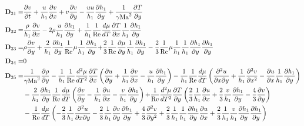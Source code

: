 \begin{align*}
  {\bf{D}}_{31}  =&\frac{{\partial v}}{{\partial t}} + \frac{u}{{h_1 }}\frac{{\partial v}}{{\partial x}} + v\frac{{\partial v}}{{\partial y}} - \frac{{uu}}{{h_1 }}\frac{{\partial h_1 }}{{\partial y}} + \frac{1}{{\gamma {\rm{Ma}}^2 }}\frac{{\partial T}}{{\partial y}}\\
  {\bf{D}}_{32}  =& \frac{\rho }{{h_1 }}\frac{{\partial v}}{{\partial x}} - 2\rho \frac{u}{{h_1 }}\frac{{\partial h_1 }}{{\partial y}} + \frac{1}{{h_1 }}\frac{1}{{{\mathop{\rm Re}\nolimits} }}\frac{{d\mu }}{{dT}}\frac{{\partial T}}{{\partial x}}\frac{1}{{h_1 }}\frac{{\partial h_1 }}{{\partial y}}\\
  {\bf{D}}_{33}  =& \rho \frac{{\partial v}}{{\partial y}} + \frac{2}{{h_1 }}\frac{{\partial h_1 }}{{\partial y}}\frac{1}{{{\mathop{\rm Re}\nolimits} }}\mu \frac{1}{{h_1 }}\frac{{\partial h_1 }}{{\partial y}}{\rm{ + }}\frac{2}{3}\frac{1}{{{\mathop{\rm Re}\nolimits} }}\frac{{\partial \mu }}{{\partial y}}\frac{1}{{h_1 }}\frac{{\partial h_1 }}{{\partial y}} - \frac{2}{3}\frac{1}{{{\mathop{\rm Re}\nolimits} }}\mu \frac{1}{{h_1 }}\frac{1}{{h_1 }}\frac{{\partial h_1 }}{{\partial y}}\frac{{\partial h_1 }}{{\partial y}}\\
  {\bf{D}}_{34}  =& 0 \\
  {\bf{D}}_{35}  =&\frac{1}{{\gamma {\rm{Ma}}^2 }}\frac{{\partial \rho }}{{\partial y}} - \frac{1}{{h_1 }}\frac{1}{{{\mathop{\rm Re}\nolimits} }}\frac{{d^2 \mu }}{{dT^2 }}\frac{{\partial T}}{{\partial x}}\left( {\frac{{\partial u}}{{\partial y}} + \frac{1}{{h_1 }}\frac{{\partial v}}{{\partial x}} - \frac{u}{{h_1 }}\frac{{\partial h_1 }}{{\partial y}}} \right) - \frac{1}{{h_1 }}\frac{1}{{{\mathop{\rm Re}\nolimits} }}\frac{{d\mu }}{{dT}}\left( {\frac{{\partial ^2 u}}{{\partial x\partial y}} + \frac{1}{{h_1 }}\frac{{\partial ^2 v}}{{\partial x^2 }} - \frac{{\partial u}}{{\partial x}}\frac{1}{{h_1 }}\frac{{\partial h_1 }}{{\partial y}}} \right)\\
  & - \frac{2}{{h_1 }}\frac{{\partial h_1 }}{{\partial y}}\frac{1}{{{\mathop{\rm Re}\nolimits} }}\frac{{d\mu }}{{dT}}\left( {\frac{{\partial v}}{{\partial y}} - \frac{1}{{h_1 }}\frac{{\partial u}}{{\partial x}} - \frac{v}{{h_1 }}\frac{{\partial h_1 }}{{\partial y}}} \right){\rm{ + }}\frac{1}{{{\mathop{\rm Re}\nolimits} }}\frac{{d^2 \mu }}{{dT^2 }}\frac{{\partial T}}{{\partial y}}\left( {\frac{2}{3}\frac{1}{{h_1 }}\frac{{\partial u}}{{\partial x}} + \frac{2}{3}\frac{v}{{h_1 }}\frac{{\partial h_1 }}{{\partial y}} - \frac{4}{3}\frac{{\partial v}}{{\partial y}}} \right)\\
  & - \frac{1}{{{\mathop{\rm Re}\nolimits} }}\frac{{d\mu }}{{dT}}\left( { - \frac{2}{3}\frac{1}{{h_1 }}\frac{{\partial ^2 u}}{{\partial x\partial y}} - \frac{2}{3}\frac{1}{{h_1 }}\frac{{\partial v}}{{\partial y}}\frac{{\partial h_1 }}{{\partial y}} + \frac{4}{3}\frac{{\partial ^2 v}}{{\partial y^2 }} + \frac{2}{3}\frac{1}{{h_1 }}\frac{1}{{h_1 }}\frac{{\partial h_1 }}{{\partial y}}\frac{{\partial u}}{{\partial x}} + \frac{2}{3}\frac{1}{{h_1 }}\frac{v}{{h_1 }}\frac{{\partial h_1 }}{{\partial y}}\frac{{\partial h_1 }}{{\partial y}}} \right)
\end{align*}
